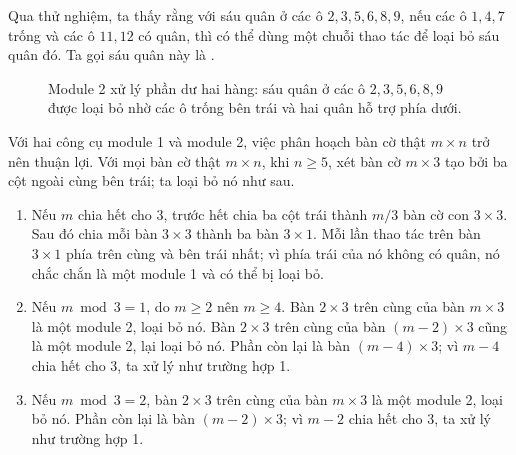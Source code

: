\documentclass[11pt]{article}
\begin{document}
Qua thử nghiệm, ta thấy rằng với sáu quân ở các ô \(2,3,5,6,8,9\), nếu các ô
\(1,4,7\) trống và các ô \(11,12\) có quân, thì có thể dùng một chuỗi thao tác
để loại bỏ sáu quân đó. Ta gọi sáu quân này là .

\begin{figure}[ht]
\centering
{}
\caption{Module 2 xử lý phần dư hai hàng: sáu quân ở các ô
\(2,3,5,6,8,9\) được loại bỏ nhờ các ô trống bên trái và hai quân hỗ trợ
phía dưới.}
\end{figure}

Với hai công cụ module 1 và module 2, việc phân hoạch bàn cờ thật \(m\times n\)
trở nên thuận lợi. Với mọi bàn cờ thật \(m\times n\), khi \(n\ge 5\), xét bàn
cờ \(m\times 3\) tạo bởi ba cột ngoài cùng bên trái; ta loại bỏ nó như sau.

\begin{enumerate}
  \item Nếu \(m\) chia hết cho \(3\), trước hết chia ba cột trái thành
  \(m/3\) bàn cờ con \(3\times 3\). Sau đó chia mỗi bàn \(3\times 3\) thành ba
  bàn \(3\times 1\). Mỗi lần thao tác trên bàn \(3\times 1\) phía trên cùng và
  bên trái nhất; vì phía trái của nó không có quân, nó chắc chắn là một module
  1 và có thể bị loại bỏ.
  \item Nếu \(m\bmod 3=1\), do \(m\ge 2\) nên \(m\ge 4\). Bàn \(2\times 3\)
  trên cùng của bàn \(m\times 3\) là một module 2, loại bỏ nó. Bàn
  \(2\times 3\) trên cùng của bàn \((m-2)\times 3\) cũng là một module 2, lại
  loại bỏ nó. Phần còn lại là bàn \((m-4)\times 3\); vì \(m-4\) chia hết cho
  \(3\), ta xử lý như trường hợp 1.
  \item Nếu \(m\bmod 3=2\), bàn \(2\times 3\) trên cùng của bàn \(m\times 3\)
  là một module 2, loại bỏ nó. Phần còn lại là bàn \((m-2)\times 3\); vì
  \(m-2\) chia hết cho \(3\), ta xử lý như trường hợp 1.
\end{enumerate}
\end{document}
